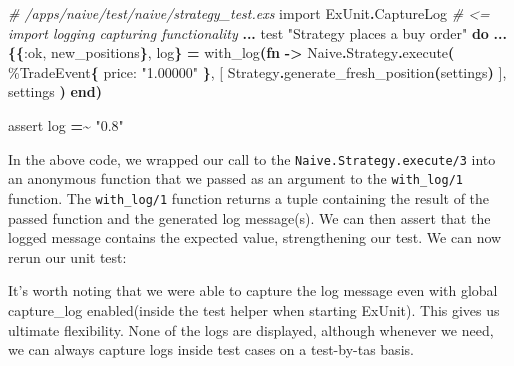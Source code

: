 \documentclass[
  oneside]{book}
\newenvironment{Shaded}{\begin{snugshade}}{\end{snugshade}}
\newcommand{\BuiltInTok}[1]{#1}
\newcommand{\CommentTok}[1]{\textcolor[rgb]{0.56,0.35,0.01}{\textit{#1}}}
\newcommand{\ConstantTok}[1]{\textcolor[rgb]{0.56,0.35,0.01}{#1}}
\newcommand{\ErrorTok}[1]{\textcolor[rgb]{0.64,0.00,0.00}{\textbf{#1}}}
\newcommand{\ExtensionTok}[1]{#1}
\newcommand{\FunctionTok}[1]{\textcolor[rgb]{0.13,0.29,0.53}{\textbf{#1}}}
\newcommand{\ImportTok}[1]{#1}
\newcommand{\KeywordTok}[1]{\textcolor[rgb]{0.13,0.29,0.53}{\textbf{#1}}}
\newcommand{\NormalTok}[1]{#1}
\newcommand{\OperatorTok}[1]{\textcolor[rgb]{0.81,0.36,0.00}{\textbf{#1}}}
\newcommand{\OtherTok}[1]{\textcolor[rgb]{0.56,0.35,0.01}{#1}}
\newcommand{\StringTok}[1]{\textcolor[rgb]{0.31,0.60,0.02}{#1}}
\newcommand{\VariableTok}[1]{\textcolor[rgb]{0.00,0.00,0.00}{#1}}
\begin{document}
\begin{Shaded}
\begin{Highlighting}[]
\CommentTok{\# /apps/naive/test/naive/strategy\_test.exs}
  \ImportTok{import} \ConstantTok{ExUnit}\OperatorTok{.}\ConstantTok{CaptureLog} \CommentTok{\# \textless{}= import logging capturing functionality}
  \OperatorTok{...}
\NormalTok{  test }\StringTok{"Strategy places a buy order"} \KeywordTok{do}
    \OperatorTok{...}
    \FunctionTok{\{\{}\VariableTok{:ok}\NormalTok{, new\_positions}\FunctionTok{\}}\NormalTok{, log}\FunctionTok{\}} \OperatorTok{=}
\NormalTok{      with\_log}\FunctionTok{(}\KeywordTok{fn} \OperatorTok{{-}\textgreater{}}
        \ConstantTok{Naive}\OperatorTok{.}\ConstantTok{Strategy}\OperatorTok{.}\NormalTok{execute}\FunctionTok{(}
\NormalTok{          \%}\ConstantTok{TradeEvent}\FunctionTok{\{}
            \VariableTok{price:} \StringTok{"1.00000"}
          \FunctionTok{\}}\NormalTok{,}
          \OtherTok{[}
            \ConstantTok{Strategy}\OperatorTok{.}\NormalTok{generate\_fresh\_position}\FunctionTok{(}\NormalTok{settings}\FunctionTok{)}
          \OtherTok{]}\NormalTok{,}
\NormalTok{          settings}
        \FunctionTok{)}
      \KeywordTok{end}\FunctionTok{)}

\NormalTok{    assert log }\OperatorTok{=\textasciitilde{}} \StringTok{"0.8"}
\end{Highlighting}
\end{Shaded}

In the above code, we wrapped our call to the \texttt{Naive.Strategy.execute/3} into an anonymous function that we passed as an argument to the \texttt{with\_log/1} function. The \texttt{with\_log/1} function returns a tuple containing the result of the passed function and the generated log message(s). We can then assert that the logged message contains the expected value, strengthening our test. We can now rerun our unit test:

\begin{Shaded}
\end{Shaded}

It's worth noting that we were able to capture the log message even with global capture\_log enabled(inside the test helper when starting ExUnit). This gives us ultimate flexibility. None of the logs are displayed, although whenever we need, we can always capture logs inside test cases on a test-by-tas basis.
\end{document}
